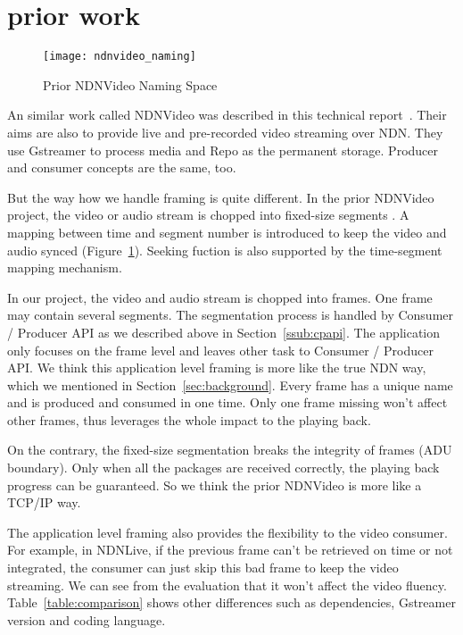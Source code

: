 \section{prior work} %
\label{sec:comparison}
\begin{figure}%
  \centering
  \texttt{[image: ndnvideo\_naming]}
  \caption{Prior NDNVideo Naming Space}
  \label{fig:ndnvideo_naming}
\end{figure}
An similar work called NDNVideo was described in this technical report~\cite{ndnvideo}. Their aims are also to provide live and pre-recorded video streaming over NDN. They use Gstreamer to process media and Repo as the permanent storage. Producer and consumer concepts are the same, too. 

But the way how we handle framing is quite different. In the prior NDNVideo project, the video or audio stream is chopped into fixed-size segments . A mapping between time and segment number is introduced to keep the video and audio synced (Figure~\ref{fig:ndnvideo_naming}). Seeking fuction is also supported by the time-segment mapping mechanism. 

In our project, the video and audio stream is chopped into frames. One frame may contain several segments. The segmentation process is handled by Consumer / Producer API as we described above in Section~\ref{ssub:cpapi}. The application only focuses on the frame level and leaves other task to Consumer / Producer API. We think this application level framing is more like the true NDN way, which we mentioned in Section~\ref{sec:background}. Every frame has a unique name and is produced and consumed in one time. Only one frame missing won't affect other frames, thus leverages the whole impact to the playing back.

On the contrary, the fixed-size segmentation breaks the integrity of frames (ADU boundary). Only when all the packages are received correctly, the playing back progress can be guaranteed. So we think the prior NDNVideo is more like a TCP/IP way. 

The application level framing also provides the flexibility to the video consumer. For example, in NDNLive, if the previous frame can't be retrieved on time or not integrated, the consumer can just skip this bad frame to keep the video streaming. We can see from the evaluation that it won't affect the video fluency. Table~\ref{table:comparison} shows other differences such as dependencies, Gstreamer version and coding language.

